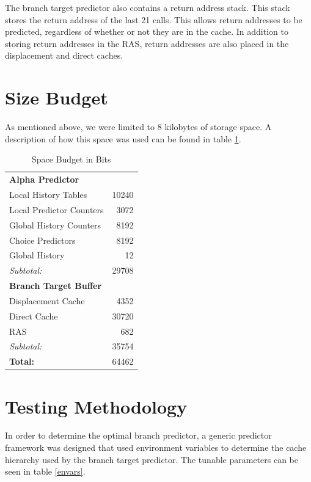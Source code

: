 \documentclass[twocolumn]{article}
\begin{document}
The branch target predictor also contains a return address stack. This
stack stores the return address of the last 21 calls. This allows
return addresses to be predicted, regardless of whether or not they
are in the cache. In addition to storing return addresses in the RAS,
return addresses are also placed in the displacement and direct
caches.

\section{Size Budget}
As mentioned above, we were limited to 8 kilobytes of storage space. A
description of how this space was used can be found in table
\ref{spaaace}.


\begin{table}\begin{center}\begin{tabular}{lr}
\textbf{Alpha Predictor} & \\
Local History Tables & 10240 \\
Local Predictor Counters & 3072\\
Global History Counters & 8192\\
Choice Predictors & 8192\\
Global History & 12\\
\hline
\emph{Subtotal:} & 29708 \\
\textbf{Branch Target Buffer} & \\
Displacement Cache & 4352 \\
Direct Cache & 30720 \\
RAS & 682 \\
\hline
\emph{Subtotal:} & 35754 \\
\hline
\textbf{Total:} & 64462\\
\end{tabular}
\caption{Space Budget in Bits}
\label{spaaace}
\end{center}\end{table}


\section{Testing Methodology}

In order to determine the optimal branch predictor, a generic
predictor framework was designed that used environment variables to
determine the cache hierarchy used by the branch target predictor.
The tunable parameters can be seen in table \ref{envars}.
\end{document}
